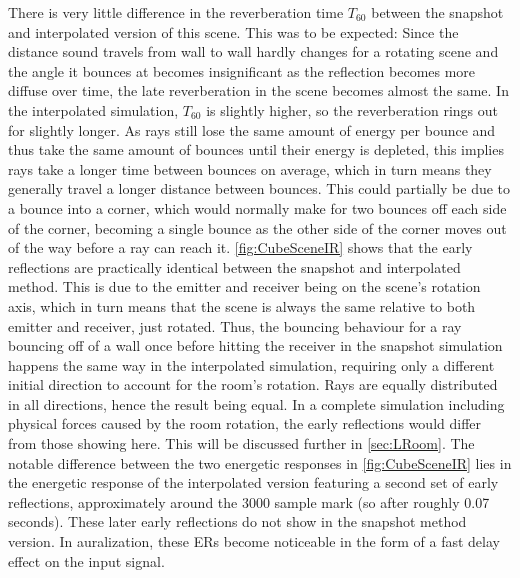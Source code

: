 There is very little difference in the reverberation time \(T_{60}\) between the snapshot and interpolated version of this scene.
This was to be expected: Since the distance sound travels from wall to wall hardly changes for a rotating scene
and the angle it bounces at becomes insignificant as the reflection becomes more diffuse over time,
the late reverberation in the scene becomes almost the same.
In the interpolated simulation, \(T_{60}\) is slightly higher,
so the reverberation rings out for slightly longer.
\newline
As rays still lose the same amount of energy per bounce
and thus take the same amount of bounces until their energy is depleted,
this implies rays take a longer time between bounces on average,
which in turn means they generally travel a longer distance between bounces.
\newline
This could partially be due to a bounce into a corner,
which would normally make for two bounces off each side of the corner,
becoming a single bounce as the other side of the corner moves out of the way before a ray can reach it.
\newline
\autoref{fig:CubeSceneIR} shows that the early reflections are practically identical between the snapshot and interpolated method.
This is due to the emitter and receiver being on the scene's rotation axis,
which in turn means that the scene is always the same relative to both emitter and receiver, just rotated.
\newline
Thus, the bouncing behaviour for a ray bouncing off of a wall once before hitting the receiver
in the snapshot simulation happens the same way in the interpolated simulation,
requiring only a different initial direction to account for the room's rotation.
Rays are equally distributed in all directions, hence the result being equal.
\newline
In a complete simulation including physical forces caused by the room rotation,
the early reflections would differ from those showing here.
This will be discussed further in \autoref{sec:LRoom}.
\newline
The notable difference between the two energetic responses in \autoref{fig:CubeSceneIR}
lies in the energetic response of the interpolated version featuring a second set of early reflections,
approximately around the 3000 sample mark (so after roughly 0.07 seconds).
These later early reflections do not show in the snapshot method version.
In auralization, these ERs become noticeable in the form of a fast delay effect on the input signal.
